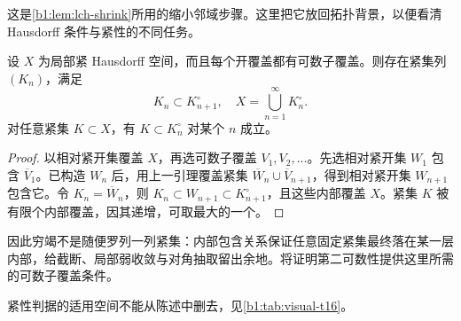 这是\cref{b1:lem:lch-shrink}所用的缩小邻域步骤。这里把它放回拓扑背景，以便看清 Hausdorff 条件与紧性的不同任务。

\begin{proposition}\label{b1:prop:app-compact-exhaustion}
设 \(X\) 为局部紧 Hausdorff 空间，而且每个开覆盖都有可数子覆盖。则存在紧集列 \((K_n)\)，满足
\[
 K_n\subset K_{n+1}^{\circ},\quad X=\bigcup_{n=1}^{\infty}K_n^\circ.
\]
对任意紧集 \(K\subset X\)，有 \(K\subset K_n^\circ\) 对某个 \(n\) 成立。
\end{proposition}
\begin{proof}
以相对紧开集覆盖 \(X\)，再选可数子覆盖 \(V_1,V_2,\ldots\)。先选相对紧开集 \(W_1\) 包含 \(\overline V_1\)。已构造 \(W_n\) 后，用上一引理覆盖紧集 \(\overline W_n\cup\overline V_{n+1}\)，得到相对紧开集 \(W_{n+1}\) 包含它。令 \(K_n=\overline W_n\)，则 \(K_n\subset W_{n+1}\subset K_{n+1}^\circ\)，且这些内部覆盖 \(X\)。紧集 \(K\) 被有限个内部覆盖，因其递增，可取最大的一个。
\end{proof}

因此穷竭不是随便罗列一列紧集：内部包含关系保证任意固定紧集最终落在某一层内部，给截断、局部弱收敛与对角抽取留出余地。将证明第二可数性提供这里所需的可数子覆盖条件。

紧性判据的适用空间不能从陈述中删去，见\cref{b1:tab:visual-t16}。

